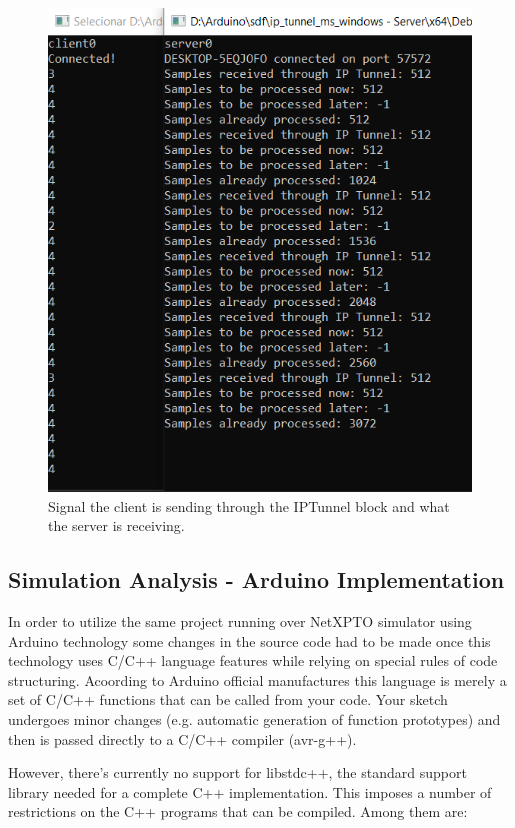 \begin{refsection}
\begin{itemize}
\begin{figure}[H]
	\centering
	\includegraphics[width=0.8\linewidth]{./sdf/arduino_quantum_rx/figures/tunel2.PNG}
	\caption{Signal the client is sending through the IPTunnel block and what the server is receiving.}
	\label{fig:arduino}
\end{figure}
\end{itemize}
	
	
	
	
	
	\subsection{Simulation Analysis - Arduino Implementation}
	
	In order to utilize the same project running over NetXPTO simulator using Arduino technology some changes in the source code had to be made once this technology uses C/C++ language features while relying on special rules of code structuring. Acoording to Arduino official manufactures this language is merely a set of C/C++ functions that can be called from your code. Your sketch undergoes minor changes (e.g. automatic generation of function prototypes) and then is passed directly to a C/C++ compiler (avr-g++). \par However, there's currently no support for libstdc++, the standard support library needed for a complete C++ implementation. This imposes a number of restrictions on the C++ programs that can be compiled. Among them are:
	

\end{refsection}
